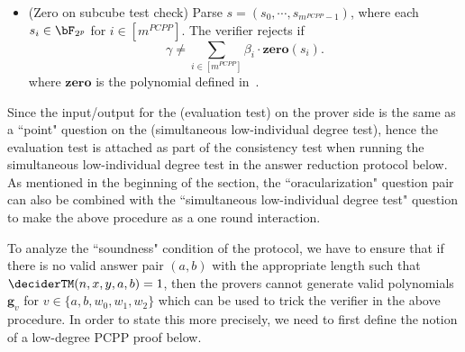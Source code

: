 \begin{enumerate}
\begin{enumerate}
\begin{itemize}
			\begin{equation*}
				\gamma \neq \textbf{g}_{\deciderTM}(s) \cdot (u_1 - b_0) \cdots (u_4 - b_4). 
			\end{equation*}
			\item (Zero on subcube test check) Parse $s = (s_0, \cdots, s_{m^{PCPP} -1})$, where each $s_i \in \bF_{2^p}$ for $i \in [m^{PCPP}]$. The verifier rejects if
			\begin{equation*}
				\gamma \neq \sum_{i \in[m^{PCPP}]} \beta_i \cdot \textbf{zero}(s_i). 
			\end{equation*}
		where $\textbf{zero}$ is the polynomial defined in~.
		\end{itemize}
	\end{enumerate}
\end{enumerate}

Since the input/output for the (evaluation test) on the prover side is the same as a ``point" question on the (simultaneous low-individual degree test), hence the evaluation test is attached as part of the consistency test when running the simultaneous low-individual degree test in the answer reduction protocol below. As mentioned in the beginning of the section, the ``oracularization" question pair can also be combined with the ``simultaneous low-individual degree test" question to make the above procedure as a one round interaction. 

To analyze the ``soundness" condition of the protocol, we have to ensure that if there is no valid answer pair $(a,b)$ with the appropriate length such that $\deciderTM(n,x,y,a,b) =1$, then the provers cannot generate valid polynomials $\textbf{g}_v$ for $v \in \{a,b,  w_0, w_1, w_2\}$ which can be used to trick the verifier in the above procedure. In order to state this more precisely, we need to first define the notion of a low-degree PCPP proof below. 

